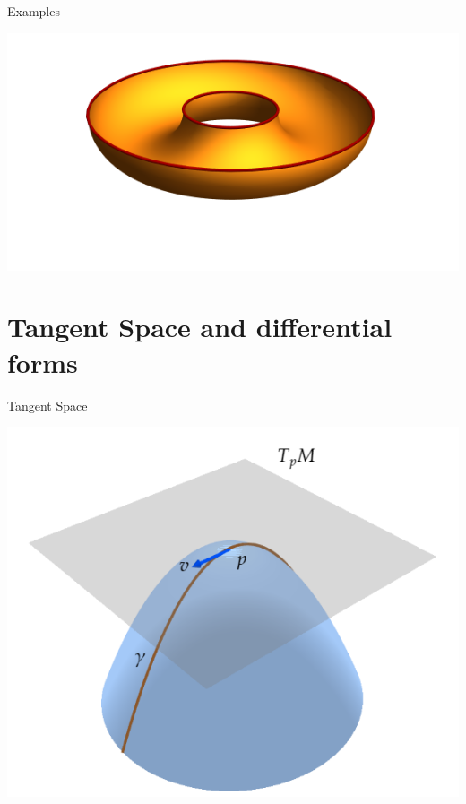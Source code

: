 \documentclass[9pt]{beamer}
\begin{document}
\begin{frame}{Examples}
    \begin{center}
        \includegraphics[scale=0.8]{half_torus.png}
        
    \end{center}
\end{frame}

\section{Tangent Space and differential forms}


\begin{frame}{Tangent Space}
    \begin{center}
        
    \includegraphics[scale=0.5]{tangent_space.png}
    \end{center}
\end{frame}
\end{document}

